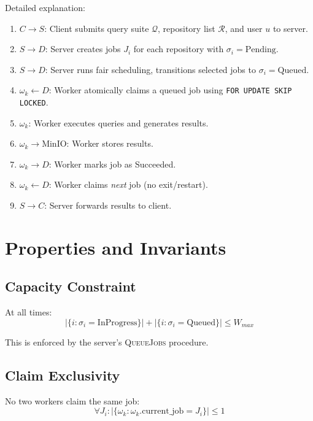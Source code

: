 \documentclass[11pt]{article}
\begin{document}
Detailed explanation:
\begin{enumerate}
\item $C \to S$: Client submits query suite $\mathcal{Q}$, repository list
  $\mathcal{R}$, and user $u$ to server.
\item $S \to D$: Server creates jobs $J_i$ for each repository with
  $\sigma_i = \text{Pending}$.
\item $S \to D$: Server runs fair scheduling, transitions selected jobs to
  $\sigma_i = \text{Queued}$.
\item $\omega_k \leftarrow D$: Worker atomically claims a queued job using
  \texttt{FOR UPDATE SKIP LOCKED}.
\item $\omega_k$: Worker executes queries and generates results.
\item $\omega_k \to \text{MinIO}$: Worker stores results.
\item $\omega_k \to D$: Worker marks job as Succeeded.
\item $\omega_k \leftarrow D$: Worker claims \emph{next} job (no exit/restart).
\item $S \to C$: Server forwards results to client.
\end{enumerate}


\section{Properties and Invariants}

\subsection{Capacity Constraint}

At all times:
\begin{equation}
|\{i : \sigma_i = \text{InProgress}\}| + |\{i : \sigma_i = \text{Queued}\}| \leq W_{max}
\end{equation}

This is enforced by the server's \textsc{QueueJobs} procedure.

\subsection{Claim Exclusivity}

No two workers claim the same job:
\begin{equation}
\forall J_i: |\{\omega_k : \omega_k.\text{current\_job} = J_i\}| \leq 1
\end{equation}
\end{document}
